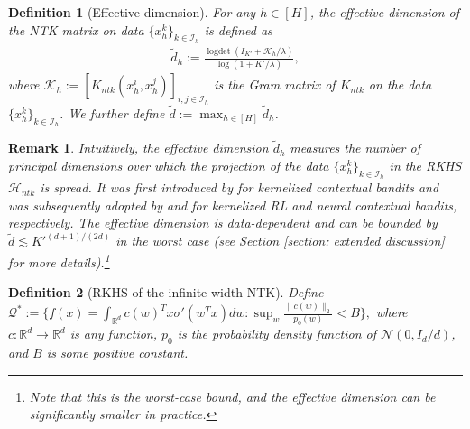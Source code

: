 \documentclass{article} \usepackage{iclr2023/iclr2023_conference,times}
\DeclareMathOperator*{\logdet}{logdet}
\newtheorem{defn}{Definition}
\newtheorem{remark}{Remark}
\begin{document}
\begin{defn}[Effective dimension]
For any $h \in [H]$, the effective dimension of the NTK matrix on data $\{x^k_h\}_{k \in \mathcal{I}_h}$ is defined as 
\begin{align*}
    \tilde{d}_h := \frac{\logdet(I_{K'} + \mathcal{K}_h/\lambda)}{\log(1 + K' / \lambda)},
\end{align*}
where $\mathcal{K}_h := [K_{ntk}(x^i_h, x^j_h)]_{i,j \in \mathcal{I}_h}$ is the Gram matrix of $K_{ntk}$ on the data $\{x^k_h\}_{k \in \mathcal{I}_h}$. We further define $\tilde{d} := \max_{h \in [H]} \tilde{d}_h$. 
\label{definition: effective dimension}
\end{defn}
\begin{remark}
Intuitively, the effective dimension $\tilde{d}_h$ measures the number of principal dimensions over which the projection of the data $\{x^k_h\}_{k \in \mathcal{I}_h}$ in the RKHS $\mathcal{H}_{ntk}$ is spread. It was first introduced by \citet{valko2013finite} for kernelized contextual bandits and was subsequently adopted by \citet{yang2020reinforcement} and \citet{zhou2020neural} for kernelized RL and neural contextual bandits, respectively. The effective dimension is data-dependent and can be bounded by $\tilde{d} \lesssim K'^{(d+1) / (2d)}$ in the worst case (see Section \ref{section: extended discussion} for more details).\footnote{Note that this is the worst-case bound, and the effective dimension can be significantly smaller in practice.} 
\end{remark}



{
\begin{defn}[RKHS of the infinite-width NTK] 
Define  
$\mathcal{Q}^* := \{ f(x) = \int_{\mathbb{R}^d} c(w)^T x \sigma'(w^T x) d w: \sup_{w} \frac{\| c(w) \|_2}{p_0(w)} < B \}, 
    \label{eq: function class}$
where $c: \mathbb{R}^d \rightarrow \mathbb{R}^d$ is any function, $p_0$ is the probability density function of $\mathcal{N}(0, I_d/d)$, and $B$ is some positive constant.
\label{eq: target function class}
\end{defn}
}
\end{document}
